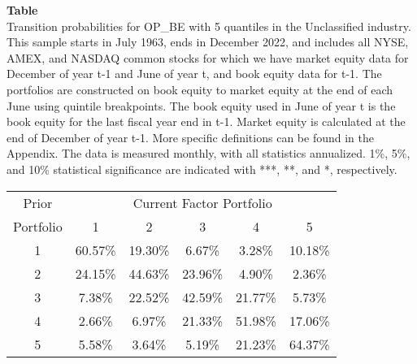 \begin{table*}[ht!]
\raggedright
{}
\label{tab: transition_probs_OP_BE_Unclassified_with_5_quantiles}
\textbf{Table \thetable} \\
Transition probabilities for OP_BE with 5 quantiles in the Unclassified industry. \\
\hspace*{1em}This sample starts in July 1963, ends in December 2022, and includes all NYSE, AMEX, and NASDAQ common stocks for which we have market equity data for December of year t-1 and June of year t, and book equity data for t-1. The portfolios are constructed on book equity to market equity at the end of each June using quintile breakpoints.  The book equity used in June of year t is the book equity for the last fiscal year end in t-1.  Market equity is calculated at the end of December of year t-1.  More specific definitions can be found in the Appendix.  The data is measured monthly, with all statistics annualized.  1\%, 5\%, and 10\% statistical significance are indicated with ***, **, and *, respectively. \\
\vspace{0.5em}
\centering
\begin{adjustbox}{max width=\textwidth}
\begin{tabular}{@{}cccccc@{}}
\toprule
Prior & \multicolumn{5}{c}{Current Factor Portfolio} \\
Portfolio & 1 & 2 & 3 & 4 & 5 \\
\midrule
1 & 60.57\% & 19.30\% & 6.67\% & 3.28\% & 10.18\% \\
2 & 24.15\% & 44.63\% & 23.96\% & 4.90\% & 2.36\% \\
3 & 7.38\% & 22.52\% & 42.59\% & 21.77\% & 5.73\% \\
4 & 2.66\% & 6.97\% & 21.33\% & 51.98\% & 17.06\% \\
5 & 5.58\% & 3.64\% & 5.19\% & 21.23\% & 64.37\% \\
\bottomrule
\end{tabular}
\end{adjustbox}
\end{table*}